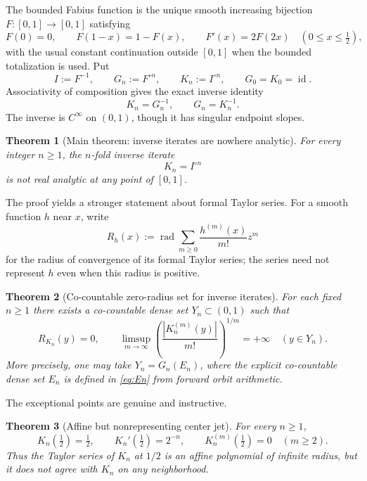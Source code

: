 \documentclass[11pt,oneside]{article}
\newtheorem{theorem}{Theorem}[section]
\theoremstyle{definition}
\theoremstyle{remark}
\newcommand{\id}{\operatorname{id}}
\newcommand{\comp}{\mathbin{\circ}}
\newcommand{\half}{\tfrac12}
\newcommand{\rad}{\operatorname{rad}}
\begin{document}
The bounded Fabius function is the unique smooth increasing bijection
$F\colon[0,1]\to[0,1]$ satisfying
\begin{equation}
 F(0)=0,\qquad F(1-x)=1-F(x),\qquad F'(x)=2F(2x)
 \quad(0\leq x\leq\half),
 \label{eq:basic-F}
\end{equation}
with the usual constant continuation outside $[0,1]$ when the bounded totalization is
used.  Put
\begin{equation}
 I:=F^{-1},\qquad G_n:=F^{\comp n},\qquad K_n:=I^{\comp n},
 \qquad G_0=K_0=\id.
 \label{eq:iterates}
\end{equation}
Associativity of composition gives the exact inverse identity
\begin{equation}
 K_n=G_n^{-1},\qquad G_n=K_n^{-1}.
 \label{eq:iterate-inverse-identity}
\end{equation}
The inverse is $C^\infty$ on $(0,1)$, though it has singular endpoint slopes.

\begin{theorem}[Main theorem: inverse iterates are nowhere analytic]
\label{thm:inverse-main}
For every integer $n\geq1$, the $n$-fold inverse iterate
\[
 K_n=I^{\comp n}
\]
is not real analytic at any point of $[0,1]$.
\end{theorem}

The proof yields a stronger statement about formal Taylor series.  For a smooth
function $h$ near $x$, write
\[
 R_h(x):=\rad\sum_{m\geq0}\frac{h^{(m)}(x)}{m!}z^m
\]
for the radius of convergence of its formal Taylor series; the series need not
represent $h$ even when this radius is positive.

\begin{theorem}[Co-countable zero-radius set for inverse iterates]
\label{thm:inverse-strong}
For each fixed $n\geq1$ there exists a co-countable dense set
$Y_n\subset(0,1)$ such that
\begin{equation}
 R_{K_n}(y)=0,
 \qquad
 \limsup_{m\to\infty}
 \left(\frac{|K_n^{(m)}(y)|}{m!}\right)^{1/m}=+\infty
 \quad(y\in Y_n).
 \label{eq:inverse-zero-radius}
\end{equation}
More precisely, one may take $Y_n=G_n(E_n)$, where the explicit co-countable dense set
$E_n$ is defined in \eqref{eq:En} from forward orbit arithmetic.
\end{theorem}

The exceptional points are genuine and instructive.

\begin{theorem}[Affine but nonrepresenting center jet]
\label{thm:center-jet}
For every $n\geq1$,
\begin{equation}
 K_n(\half)=\half,\qquad K_n'(\half)=2^{-n},\qquad
 K_n^{(m)}(\half)=0\quad(m\geq2).
 \label{eq:center-jet}
\end{equation}
Thus the Taylor series of $K_n$ at $1/2$ is an affine polynomial of infinite radius,
but it does not agree with $K_n$ on any neighborhood.
\end{theorem}
\end{document}
